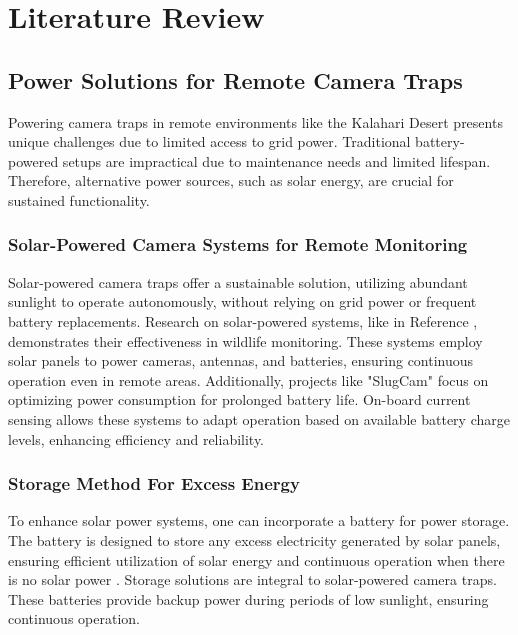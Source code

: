\documentclass[class=report,11pt,crop=false]{standalone}
\begin{document}
\ifstandalone
\tableofcontents
\fi
\chapter{Literature Review \label{ch:literature}}
\vspace{-0.5cm}
\section{Power Solutions for Remote Camera Traps}
Powering camera traps in remote environments like the Kalahari Desert presents unique challenges due to limited access to grid power. Traditional battery-powered setups are impractical due to maintenance needs and limited lifespan. Therefore, alternative power sources, such as solar energy, are crucial for sustained functionality.

\subsection{Solar-Powered Camera Systems for Remote Monitoring}
Solar-powered camera traps offer a sustainable solution, utilizing abundant sunlight to operate autonomously, without relying on grid power or frequent battery replacements. Research on solar-powered systems, like in Reference \cite{PowerNestingRaptors}, demonstrates their effectiveness in wildlife monitoring. These systems employ solar panels to power cameras, antennas, and batteries, ensuring continuous operation even in remote areas. Additionally, projects like "SlugCam" \cite{OutdoorVideoMonitoring} focus on optimizing power consumption for prolonged battery life. On-board current sensing allows these systems to adapt operation based on available battery charge levels, enhancing efficiency and reliability.

\subsection{Storage Method For Excess Energy}
To enhance solar power systems, one can incorporate a battery for power storage. The battery is designed to store any excess electricity generated by solar panels, ensuring efficient utilization of solar energy and continuous operation when there is no solar power \cite{Palmetto}. Storage solutions are integral to solar-powered camera traps. These batteries provide backup power during periods of low sunlight, ensuring continuous operation.
\end{document}

